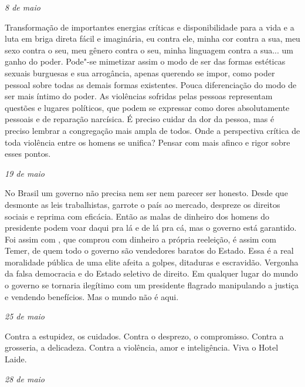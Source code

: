 \pagebreak

\begin{flushright}
\emph{8 de maio}
\end{flushright}

Transformação de importantes energias críticas e disponibilidade para a
vida e a luta em briga direta fácil e imaginária, eu contra ele, minha
cor contra a sua, meu sexo contra o seu, meu gênero contra o seu, minha
linguagem contra a sua... um ganho do poder. Pode"-se mimetizar assim o
modo de ser das formas estéticas sexuais burguesas e sua arrogância,
apenas querendo se impor, como poder pessoal sobre todas as demais
formas existentes. Pouca diferenciação do modo de ser mais íntimo do
poder. As violências sofridas pelas pessoas representam questões e
lugares políticos, que podem se expressar como dores absolutamente
pessoais e de reparação narcísica. É preciso cuidar da dor da pessoa,
mas é preciso lembrar a congregação mais ampla de todos. Onde a
perspectiva crítica de toda violência entre os homens se unifica? Pensar
com mais afinco e rigor sobre esses pontos.

\begin{flushright}
\emph{19 de maio}
\end{flushright}

No Brasil um governo não precisa nem ser nem parecer ser honesto. Desde
que desmonte as leis trabalhistas, garrote o país ao mercado, despreze
os direitos sociais e reprima com eficácia. Então as malas de dinheiro
dos homens do presidente podem voar daqui pra lá e de lá pra cá, mas o
governo está garantido. Foi assim com , que comprou com dinheiro a
própria reeleição, é assim com Temer, de quem todo o governo são
vendedores baratos do Estado. Essa é a real moralidade pública de uma
elite afeita a golpes, ditaduras e escravidão. Vergonha da falsa
democracia e do Estado seletivo de direito. Em qualquer lugar do mundo o
governo se tornaria ilegítimo com um presidente flagrado manipulando a
justiça e vendendo benefícios. Mas o mundo não é aqui.

\begin{flushright}
\emph{25 de maio}
\end{flushright}

Contra a estupidez, os cuidados. Contra o desprezo, o compromisso.
Contra a grosseria, a delicadeza. Contra a violência, amor e
inteligência. Viva o Hotel Laide.

\begin{flushright}
\emph{28 de maio}
\end{flushright}

